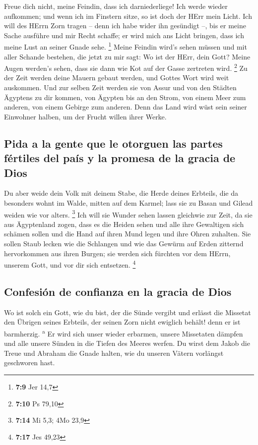  Freue dich nicht, meine Feindin, dass ich darniederliege!
Ich werde wieder aufkommen; und wenn ich im Finstern sitze, so ist doch
der HErr mein Licht.  Ich will des HErrn Zorn tragen --
denn ich habe wider ihn gesündigt --, bis er meine Sache ausführe und
mir Recht schaffe; er wird mich ans Licht bringen, dass ich meine Lust
an seiner Gnade sehe. \footnote{\textbf{7:9} Jer 14,7} 
Meine Feindin wird's sehen müssen und mit aller Schande bestehen, die
jetzt zu mir sagt: Wo ist der HErr, dein Gott? Meine Augen werden's
sehen, dass sie dann wie Kot auf der Gasse zertreten wird. \footnote{\textbf{7:10}
  Ps 79,10}  Zu der Zeit werden deine Mauern gebaut
werden, und Gottes Wort wird weit auskommen.  Und zur
selben Zeit werden sie von Assur und von den Städten Ägyptens zu dir
kommen, von Ägypten bis an den Strom, von einem Meer zum anderen, von
einem Gebirge zum anderen.  Denn das Land wird wüst sein
seiner Einwohner halben, um der Frucht willen ihrer Werke.

\hypertarget{pida-a-la-gente-que-le-otorguen-las-partes-fuxe9rtiles-del-pauxeds-y-la-promesa-de-la-gracia-de-dios}{%
\subsection{Pida a la gente que le otorguen las partes fértiles del país
y la promesa de la gracia de
Dios}\label{pida-a-la-gente-que-le-otorguen-las-partes-fuxe9rtiles-del-pauxeds-y-la-promesa-de-la-gracia-de-dios}}

 Du aber weide dein Volk mit deinem Stabe, die Herde
deines Erbteils, die da besonders wohnt im Walde, mitten auf dem Karmel;
lass sie zu Basan und Gilead weiden wie vor alters. \footnote{\textbf{7:14}
  Mi 5,3; 4Mo 23,9}  Ich will sie Wunder sehen lassen
gleichwie zur Zeit, da sie aus Ägyptenland zogen,  dass
es die Heiden sehen und alle ihre Gewaltigen sich schämen sollen und die
Hand auf ihren Mund legen und ihre Ohren zuhalten.  Sie
sollen Staub lecken wie die Schlangen und wie das Gewürm auf Erden
zitternd hervorkommen aus ihren Burgen; sie werden sich fürchten vor dem
HErrn, unserem Gott, und vor dir sich entsetzen. \footnote{\textbf{7:17}
  Jes 49,23}

\hypertarget{confesiuxf3n-de-confianza-en-la-gracia-de-dios}{%
\subsection{Confesión de confianza en la gracia de
Dios}\label{confesiuxf3n-de-confianza-en-la-gracia-de-dios}}

 Wo ist solch ein Gott, wie du bist, der die Sünde
vergibt und erlässt die Missetat den Übrigen seines Erbteils, der seinen
Zorn nicht ewiglich behält! denn er ist barmherzig. \textsuperscript{a}
 Er wird sich unser wieder erbarmen, unsere Missetaten
dämpfen und alle unsere Sünden in die Tiefen des Meeres werfen.
 Du wirst dem Jakob die Treue und Abraham die Gnade
halten, wie du unseren Vätern vorlängst geschworen hast.
